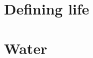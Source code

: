 \documentclass[DIV=calc, paper=a4, fontsize=12pt]{scrartcl}	 %
\begin{document}

\section{Defining life}

\begin{multicols}{2}





\end{multicols} \noindent\makebox[\linewidth]{\rule{\textwidth}{0.4pt}}


\section{Water}

\begin{multicols}{2}



\end{multicols} \noindent\makebox[\linewidth]{\rule{\textwidth}{0.4pt}}
\end{document}
